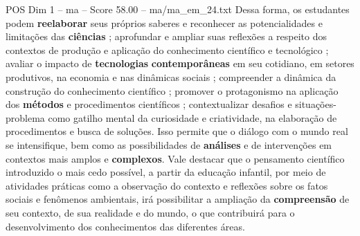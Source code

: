 \begin{textsample}{POS Dim 1 – ma – Score 58.00 – ma/ma\_em\_24.txt}
Dessa forma, os estudantes podem \textbf{reelaborar} seus próprios saberes e reconhecer as potencialidades e limitações das \textbf{ciências} ; aprofundar e ampliar suas reflexões a respeito dos contextos de produção e aplicação do conhecimento científico e tecnológico ; avaliar o impacto de \textbf{tecnologias} \textbf{contemporâneas} em seu cotidiano, em setores produtivos, na economia e nas dinâmicas sociais ; compreender a dinâmica da construção do conhecimento científico ; promover o protagonismo na aplicação dos \textbf{métodos} e procedimentos científicos ; contextualizar desafios e situações-problema como gatilho mental da curiosidade e criatividade, na elaboração de procedimentos e busca de soluções.
Isso permite que o diálogo com o mundo real se intensifique, bem como as possibilidades de \textbf{análises} e de intervenções em contextos mais amplos e \textbf{complexos}.
Vale destacar que o pensamento científico introduzido o mais cedo possível, a partir da educação infantil, por meio de atividades práticas como a observação do contexto e reflexões sobre os fatos sociais e fenômenos ambientais, irá possibilitar a ampliação da \textbf{compreensão} de seu contexto, de sua realidade e do mundo, o que contribuirá para o desenvolvimento dos conhecimentos das diferentes áreas.

\end{textsample}

